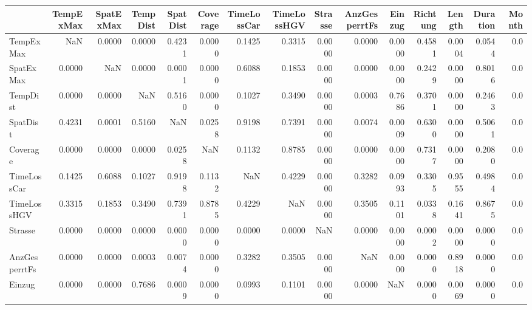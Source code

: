 \begin{tabular}{lrrrrrrrrrrrrrr}
\toprule
{} &  TempExMax &  SpatExMax &  TempDist &  SpatDist &  Coverage &  TimeLossCar &  TimeLossHGV &  Strasse &  AnzGesperrtFs &  Einzug &  Richtung &  Length &  Duration &  Month \\
\midrule
TempExMax     &        NaN &     0.0000 &    0.0000 &    0.4231 &    0.0000 &       0.1425 &       0.3315 &   0.0000 &         0.0000 &  0.0000 &    0.4581 &  0.0004 &    0.0544 &    0.0 \\
SpatExMax     &     0.0000 &        NaN &    0.0000 &    0.0001 &    0.0000 &       0.6088 &       0.1853 &   0.0000 &         0.0000 &  0.0000 &    0.2429 &  0.0000 &    0.8016 &    0.0 \\
TempDist      &     0.0000 &     0.0000 &       NaN &    0.5160 &    0.0000 &       0.1027 &       0.3490 &   0.0000 &         0.0003 &  0.7686 &    0.3701 &  0.0000 &    0.2463 &    0.0 \\
SpatDist      &     0.4231 &     0.0001 &    0.5160 &       NaN &    0.0258 &       0.9198 &       0.7391 &   0.0000 &         0.0074 &  0.0009 &    0.6300 &  0.0000 &    0.5061 &    0.0 \\
Coverage      &     0.0000 &     0.0000 &    0.0000 &    0.0258 &       NaN &       0.1132 &       0.8785 &   0.0000 &         0.0000 &  0.0000 &    0.7317 &  0.0000 &    0.2080 &    0.0 \\
TimeLossCar   &     0.1425 &     0.6088 &    0.1027 &    0.9198 &    0.1132 &          NaN &       0.4229 &   0.0000 &         0.3282 &  0.0993 &    0.3305 &  0.9555 &    0.4984 &    0.0 \\
TimeLossHGV   &     0.3315 &     0.1853 &    0.3490 &    0.7391 &    0.8785 &       0.4229 &          NaN &   0.0000 &         0.3505 &  0.1101 &    0.0338 &  0.1641 &    0.8675 &    0.0 \\
Strasse       &     0.0000 &     0.0000 &    0.0000 &    0.0000 &    0.0000 &       0.0000 &       0.0000 &      NaN &         0.0000 &  0.0000 &    0.0002 &  0.0000 &    0.0000 &    0.0 \\
AnzGesperrtFs &     0.0000 &     0.0000 &    0.0003 &    0.0074 &    0.0000 &       0.3282 &       0.3505 &   0.0000 &            NaN &  0.0000 &    0.0000 &  0.8918 &    0.0000 &    0.0 \\
Einzug        &     0.0000 &     0.0000 &    0.7686 &    0.0009 &    0.0000 &       0.0993 &       0.1101 &   0.0000 &         0.0000 &     NaN &    0.0000 &  0.0069 &    0.0000 &    0.0 \\

\end{tabular}
